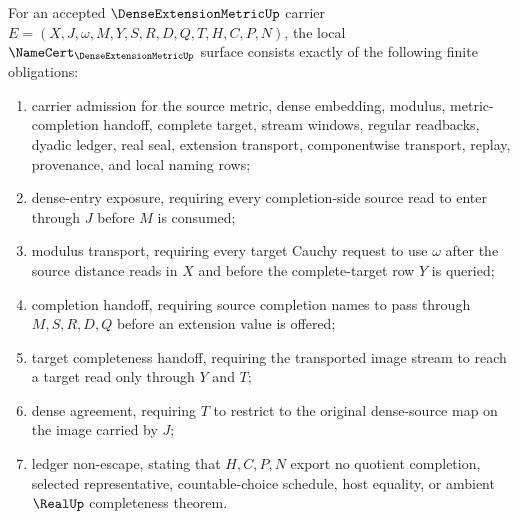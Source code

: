 
\begin{theorem}
\label{thm:dense-extension-metric-namecert-obligations}
For an accepted $\DenseExtensionMetricUp$ carrier $E=(X,J,\omega,M,Y,S,R,D,Q,T,H,C,P,N)$, the local $\NameCert_{\DenseExtensionMetricUp}$ surface consists exactly of the following finite obligations:
\begin{enumerate}
\item carrier admission for the source metric, dense embedding, modulus, metric-completion handoff, complete target, stream windows, regular readbacks, dyadic ledger, real seal, extension transport, componentwise transport, replay, provenance, and local naming rows;
\item dense-entry exposure, requiring every completion-side source read to enter through $J$ before $M$ is consumed;
\item modulus transport, requiring every target Cauchy request to use $\omega$ after the source distance reads in $X$ and before the complete-target row $Y$ is queried;
\item completion handoff, requiring source completion names to pass through $M,S,R,D,Q$ before an extension value is offered;
\item target completeness handoff, requiring the transported image stream to reach a target read only through $Y$ and $T$;
\item dense agreement, requiring $T$ to restrict to the original dense-source map on the image carried by $J$;
\item ledger non-escape, stating that $H,C,P,N$ export no quotient completion, selected representative, countable-choice schedule, host equality, or ambient $\RealUp$ completeness theorem.
\end{enumerate}
\end{theorem}
